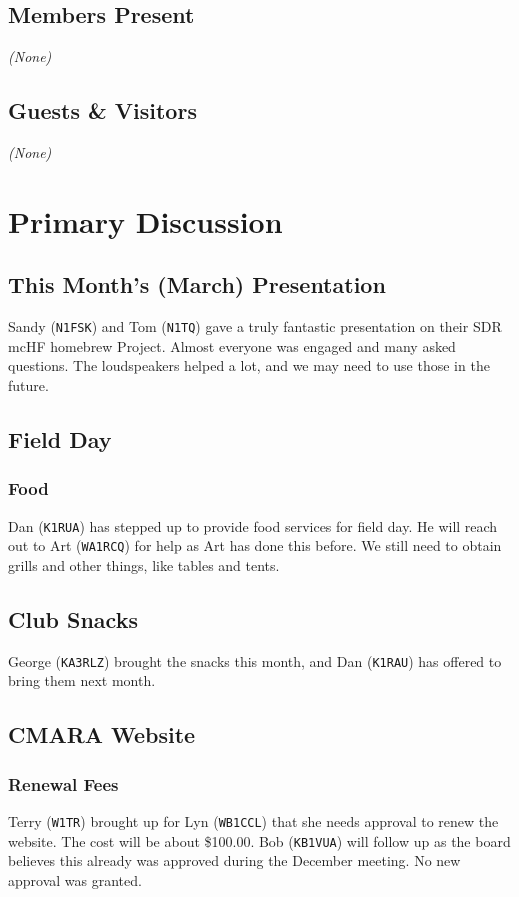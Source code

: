 \documentclass[10pt,letterpaper]{article}
\begin{document}
\subsection{Members Present}
\emph{(None)}

\subsection{Guests \& Visitors}
\emph{(None)}

\section{Primary Discussion}

\subsection{This Month's (March) Presentation}
Sandy (\texttt{N1FSK}) and Tom (\texttt{N1TQ}) gave a truly fantastic presentation on their SDR mcHF homebrew Project. Almost everyone was engaged and many asked questions. The loudspeakers helped a lot, and we may need to use those in the future.


\subsection{Field Day}
\subsubsection{Food}
Dan (\texttt{K1RUA}) has stepped up to provide food services for field day. He will reach out to Art (\texttt{WA1RCQ}) for help as Art has done this before. We still need to obtain grills and other things, like tables and tents.

\subsection{Club Snacks}
George (\texttt{KA3RLZ}) brought the snacks this month, and Dan (\texttt{K1RAU}) has offered to bring them next month.

\subsection{CMARA Website}
\subsubsection{Renewal Fees}
Terry (\texttt{W1TR}) brought up for Lyn (\texttt{WB1CCL}) that she needs approval to renew the website. The cost will be about \$100.00. Bob (\texttt{KB1VUA}) will follow up as the board believes this already was approved during the December meeting. No new approval was granted.
\end{document}

